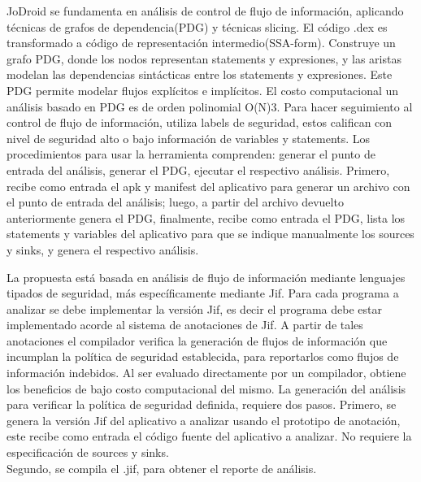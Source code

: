 JoDroid se fundamenta en análisis de control de flujo de información, aplicando
técnicas de grafos de dependencia(PDG) y técnicas slicing.\newline 
El código .dex es transformado a código de representación intermedio(SSA-form).
Construye un grafo PDG, donde los nodos representan statements y expresiones, y
las aristas modelan las dependencias sintácticas entre los statements y
expresiones. Este PDG permite modelar flujos explícitos e implícitos.\newline
El costo computacional un análisis basado en PDG es de orden polinomial
O(N)3\cite[page 3]{FCO-PDG}.\newline 
Para hacer seguimiento al control de flujo de información, utiliza labels de
seguridad, estos califican con nivel de seguridad alto o bajo información de
variables y statements.\newline
Los procedimientos para usar la herramienta comprenden: generar el punto de
entrada del análisis, generar el PDG, ejecutar el respectivo análisis. Primero,
recibe como entrada el apk y manifest del aplicativo para generar un archivo con
el punto de entrada del análisis; luego, a partir del archivo devuelto
anteriormente genera el PDG, finalmente, recibe como entrada el PDG, lista los
statements y variables del aplicativo para que se indique manualmente los
sources y sinks, y genera el respectivo análisis.\newline

La propuesta está basada en análisis de flujo de información mediante lenguajes
tipados de seguridad, más específicamente mediante Jif.\newline
Para cada programa a analizar se debe implementar la versión Jif, es decir
el programa debe estar implementado acorde al sistema de anotaciones de Jif. A
partir de tales anotaciones el compilador verifica la generación de flujos de
información que incumplan la política de seguridad establecida, para reportarlos
como flujos de información indebidos. 
Al ser evaluado directamente por un
compilador, obtiene los beneficios de bajo costo computacional del mismo.\newline
La generación del análisis para verificar la política de seguridad
definida, requiere dos pasos. Primero, se genera la versión Jif del aplicativo a
analizar usando el prototipo de anotación, este recibe como entrada el
código fuente del aplicativo a analizar. No requiere la especificación de sources
y sinks.\\
Segundo, se compila el .jif, para obtener el reporte de análisis.

